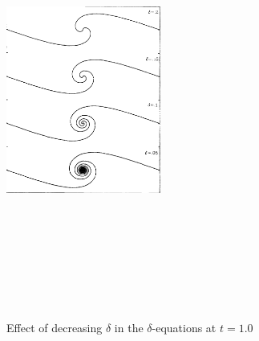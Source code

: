 \documentclass[12pt,twoside]{article}
\begin{document}
\begin{figure}[ht]
\begin{minipage}[b]{0.45\linewidth}
\includegraphics[width=2in,height=5.33in]{period.png}
\label{fig:minipage1}
\end{minipage}
\caption{Effect of decreasing $\delta$ in the $\delta$-equations at $t=1.0$ }
\end{figure}
\end{document}
